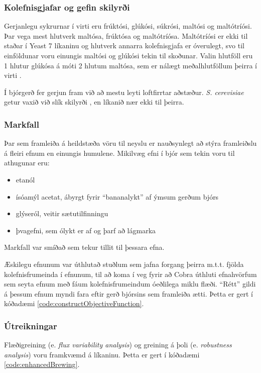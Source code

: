\documentclass[11pt]{article}
\begin{document}
\begin{multicols}{2}
\subsubsection{Kolefnisgjafar og gefin skilyrði}
Gerjanlegu sykrurnar í virti eru frúktósi, glúkósi, súkrósi, maltósi og maltótríósi. Þar vega mest hlutverk maltósa, frúktósa og maltótríósa. Maltótríósi er ekki til staðar í Yeast 7 líkaninu og hlutverk annarra kolefnisgjafa er óverulegt, svo til einföldunar voru einungis maltósi og glúkósi tekin til skoðunar. Valin hlutföll eru 1 hlutur glúkósa á móti 2 hlutum maltósa, sem er nálægt meðalhlutföllum þeirra í virti \cite{otter1967determination}. 

Í bjórgerð fer gerjun fram við að mestu leyti loftfirrtar aðstæður. \emph{S. cerevisiae} getur vaxið við slík skilyrði \cite{ishtar2007factors}, en líkanið nær ekki til þeirra.
\subsubsection{Markfall}
Þar sem framleiða á heildstæða vöru til neyslu er nauðsynlegt að stýra framleiðslu á fleiri efnum en einungis humulene. Mikilvæg efni í bjór \cite{dequin2001potential} sem tekin voru til athugunar eru:
\begin{itemize}
 \item etanól
 \item ísóamýl acetat, ábyrgt fyrir ``bananalykt'' af ýmsum gerðum bjórs
 \item glýseról, veitir sætutilfinningu
 \item þvagefni, sem ólykt er af og þarf að lágmarka
\end{itemize}
Markfall var smíðað sem tekur tillit til þessara efna. 

Æskilegu efnunum var úthlutað stuðlum sem jafna forgang þeirra m.t.t. fjölda kolefnisfrumeinda í efnunum, til að koma í veg fyrir að Cobra úthluti efnahvörfum sem seyta efnum með fáum kolefnisfrumeindum óeðlilega miklu flæði. ``Rétt'' gildi á þessum efnum myndi fara eftir gerð bjórsins sem framleiða ætti. Þetta er gert í kóðadæmi \ref{code:constructObjectiveFunction}.

\subsubsection{Útreikningar}
Flæðigreining (e. \emph{flux variability analysis}) og greining á þoli (e. \emph{robustness analysis}) voru framkvæmd á líkaninu. Þetta er gert í kóðadæmi \ref{code:enhancedBrewing}.


\end{multicols}
\end{document}
